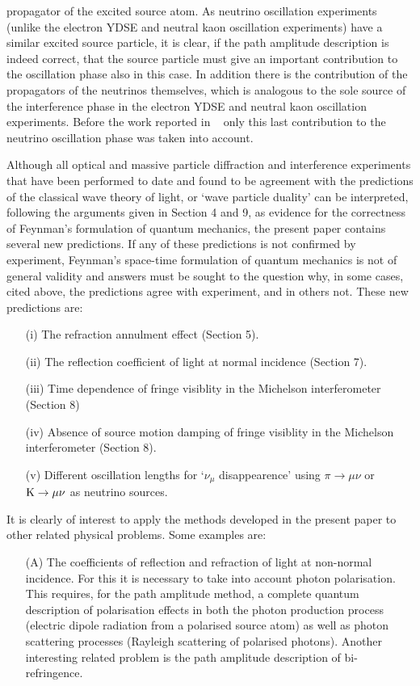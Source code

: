 {  propagator of the excited source atom. As neutrino oscillation experiments
   (unlike the electron YDSE and neutral kaon oscillation experiments)  
  have a similar excited source particle, it is clear, if the path
   amplitude description is indeed correct, that the source particle must give 
  an important contribution to the oscillation phase also in this case. In addition there is the
  contribution of the propagators of the neutrinos themselves, which is analogous
  to the sole source of the interference phase in the electron YDSE and neutral
   kaon oscillation experiments. Before the work reported in ~\cite{JHF1,JHF2,JHF3}
   only this last contribution to the neutrino oscillation phase was taken into account.
   \par Although all optical and massive particle diffraction and interference experiments that
   have been performed
    to date
   and found to be agreement with the predictions of the classical wave theory of light,
   or `wave particle duality'
   can be interpreted, following the arguments given in Section 4 and 9, as evidence for
    the correctness
  of Feynman's formulation of quantum mechanics, the present paper contains several new
  predictions. If any of these predictions is not confirmed by experiment,
   Feynman's space-time formulation of quantum mechanics is not of general validity
  and answers must be sought to the question why, in some cases, cited above,
   the predictions agree with experiment, and in others not. 
   These new predictions are:
 \begin{itemize}
  \item[(i)] The refraction annulment effect (Section 5).
 \item[(ii)] The reflection coefficient of light
            at normal incidence (Section 7).
  \item[(iii)] Time dependence of fringe visiblity in the
               Michelson interferometer (Section 8)
 \item[(iv)] Absence of source motion damping of fringe visiblity in the
               Michelson interferometer (Section 8).
  \item[(v)] Different oscillation lengths for `$\nu_{\mu}$ disappearence' using $\pi \rightarrow \mu \nu$
       or ${\rm K} \rightarrow \mu \nu$ as neutrino sources.
 \end{itemize}
 \par It is clearly of interest to apply the methods developed in the present paper to 
  other related physical problems. Some examples are:
  \begin{itemize}
   \item[(A)] The coefficients of reflection and refraction of light at non-normal incidence.
    For this it is necessary to take into account photon polarisation. This requires, for the 
    path amplitude method, a complete quantum description of polarisation effects
    in both the photon production process (electric dipole radiation from a polarised source 
    atom) as well as photon scattering processes (Rayleigh scattering of polarised photons).
    Another interesting related problem is the path amplitude description of bi-refringence.


\end{itemize}}
